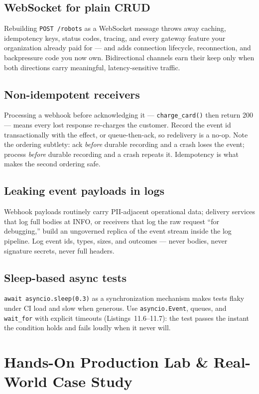 \subsection{WebSocket for plain CRUD}
Rebuilding \texttt{POST /robots} as a WebSocket message throws away caching,
idempotency keys, status codes, tracing, and every gateway feature your
organization already paid for --- and adds connection lifecycle, reconnection,
and backpressure code you now own. Bidirectional channels earn their keep
only when both directions carry meaningful, latency-sensitive traffic.

\subsection{Non-idempotent receivers}
Processing a webhook before acknowledging it --- \texttt{charge\_card()} then
return 200 --- means every lost response re-charges the customer. Record the
event id transactionally with the effect, or queue-then-ack, so redelivery is
a no-op. Note the ordering subtlety: ack \emph{before} durable recording and
a crash loses the event; process \emph{before} durable recording and a crash
repeats it. Idempotency is what makes the second ordering safe.

\subsection{Leaking event payloads in logs}
Webhook payloads routinely carry PII-adjacent operational data; delivery
services that log full bodies at INFO, or receivers that log the raw request
``for debugging,'' build an ungoverned replica of the event stream inside the
log pipeline. Log event ids, types, sizes, and outcomes --- never bodies,
never signature secrets, never full headers.

\subsection{Sleep-based async tests}
\texttt{await asyncio.sleep(0.3)} as a synchronization mechanism makes tests
flaky under CI load and slow when generous. Use \texttt{asyncio.Event},
queues, and \texttt{wait\_for} with explicit timeouts
(Listings~11.6--11.7): the test passes the instant the condition holds and
fails loudly when it never will.

\section{Hands-On Production Lab \& Real-World Case Study}
\label{sec:ch11-lab}

